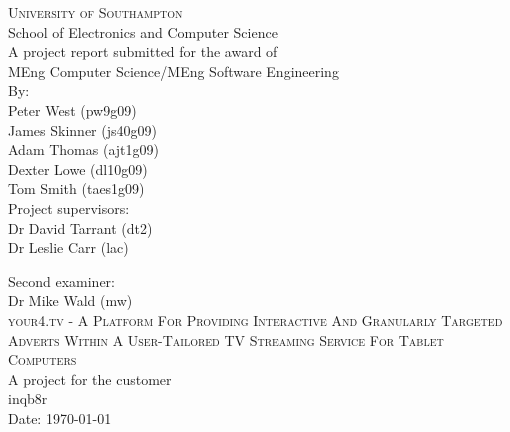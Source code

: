 
\begin{titlepage}

\begin{center}

\textsc{\large{University of Southampton}}\\[0.0cm]

\large{School of Electronics and Computer Science}\\[2.0cm]

\large{A project report submitted for the award of}\\[0.0cm]

\large{MEng Computer Science/MEng Software Engineering}\\[2.0cm]

\large{
	By: \\
	Peter West (pw9g09) \\
	James Skinner (js40g09) \\
	Adam Thomas (ajt1g09) \\
	Dexter Lowe (dl10g09) \\
	Tom Smith (taes1g09)}\\[2.0cm]

\large{Project supervisors: \\
		Dr David Tarrant (dt2) \\
		Dr Leslie Carr (lac)}

\large{Second examiner: \\
		Dr Mike Wald (mw)}\\[2.0cm]


\textsc{\large your4.tv - A Platform For Providing Interactive And Granularly Targeted Adverts Within A User-Tailored TV Streaming Service For Tablet Computers}\\[2.0cm]

\large{A project for the customer \\
		inqb8r}\\[2.0cm]

\large{Date: \today}\\[4.0cm]

\end{center}

\end{titlepage}

